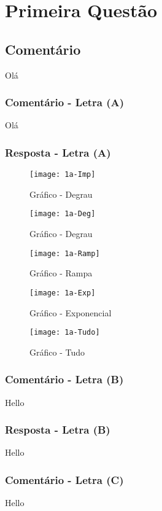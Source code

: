 \documentclass[12pt, a4paper]{article}
\begin{document}
\section{Primeira Questão}
	\subsection{Comentário}
		Olá
		\subsubsection{Comentário - Letra (A)}
			Olá
		\subsubsection{Resposta - Letra (A)}

			\begin{figure}[!ht]
				\centering
				\texttt{[image: 1a-Imp]}
				\caption{Gráfico - Degrau}
			\end{figure}

			\begin{figure}[!ht]
				\centering
				\texttt{[image: 1a-Deg]}
				\caption{Gráfico - Degrau}
			\end{figure}

			\begin{figure}[!ht]
				\centering
				\texttt{[image: 1a-Ramp]}
				\caption{Gráfico - Rampa}
			\end{figure}

			\begin{figure}[!ht]
				\centering
				\texttt{[image: 1a-Exp]}
				\caption{Gráfico - Exponencial}
			\end{figure}

			\begin{figure}[!ht]
				\centering
				\texttt{[image: 1a-Tudo]}
				\caption{Gráfico - Tudo}
			\end{figure}

		\subsubsection{Comentário - Letra (B)}
			Hello
		\subsubsection{Resposta - Letra (B)}
			Hello
		\subsubsection{Comentário - Letra (C)}
			Hello	
\end{document}
